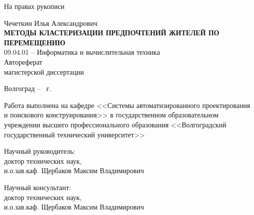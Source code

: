 \documentclass[a4paper, 14pt]{extreport}
\begin{document}
    \begin{titlepage}
        \hspace{20em}На правах рукописи\\
        \begin{center}
            \vspace{8em}Чечеткин Илья Александрович\\
            \large\vspace{2em}\textbf{\MakeUppercase{Методы кластеризации предпочтений жителей по перемещению}}\normalsize\\
            \vspace{8em}09.04.01 -- Информатика и вычислительная техника\\
            \vspace{8em}Автореферат\\магистерской диссертации
        \end{center}
        \vfill
        \begin{center}
            Волгоград -- \the\year\ г.
        \end{center}
        \newpage
        \thispagestyle{empty}
        Работа выполнена на кафедре <<Системы автоматизированного проектирования и поискового 
        конструирования>> в государственном образовательном учреждении высшего профессионального 
        образования <<Волгоградский государственный технический университет>>\\
        \vspace{3em}\begin{flushleft}
            Научный руководитель:\\
            \hspace{4cm}доктор технических наук,\\
            \hspace{4cm}и.о.зав.каф. Щербаков Максим Владимирович\\
        \end{flushleft}
        \vspace{1em}\begin{flushleft}
            Научный консультант:\\
            \hspace{4cm}доктор технических наук,\\
            \hspace{4cm}и.о.зав.каф. Щербаков Максим Владимирович\\
        \end{flushleft}
    \end{titlepage}
    \newpage
    \onehalfspacing
    \setcounter{page}{3}
    
\end{document}
